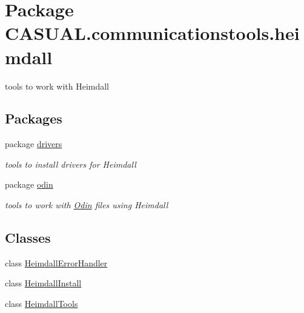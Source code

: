 \hypertarget{namespace_c_a_s_u_a_l_1_1communicationstools_1_1heimdall}{\section{Package C\-A\-S\-U\-A\-L.\-communicationstools.\-heimdall}
\label{namespace_c_a_s_u_a_l_1_1communicationstools_1_1heimdall}
}


tools to work with Heimdall  


\subsection*{Packages}
\begin{DoxyCompactItemize}
\item 
package \hyperlink{namespace_c_a_s_u_a_l_1_1communicationstools_1_1heimdall_1_1drivers}{drivers}
\begin{DoxyCompactList}\small\item\em tools to install drivers for Heimdall \end{DoxyCompactList}\item 
package \hyperlink{namespace_c_a_s_u_a_l_1_1communicationstools_1_1heimdall_1_1odin}{odin}
\begin{DoxyCompactList}\small\item\em tools to work with \hyperlink{class_c_a_s_u_a_l_1_1communicationstools_1_1heimdall_1_1odin_1_1_odin}{Odin} files using Heimdall \end{DoxyCompactList}\end{DoxyCompactItemize}
\subsection*{Classes}
\begin{DoxyCompactItemize}
\item 
class \hyperlink{class_c_a_s_u_a_l_1_1communicationstools_1_1heimdall_1_1_heimdall_error_handler}{Heimdall\-Error\-Handler}
\item 
class \hyperlink{class_c_a_s_u_a_l_1_1communicationstools_1_1heimdall_1_1_heimdall_install}{Heimdall\-Install}
\item 
class \hyperlink{class_c_a_s_u_a_l_1_1communicationstools_1_1heimdall_1_1_heimdall_tools}{Heimdall\-Tools}
\end{DoxyCompactItemize}


